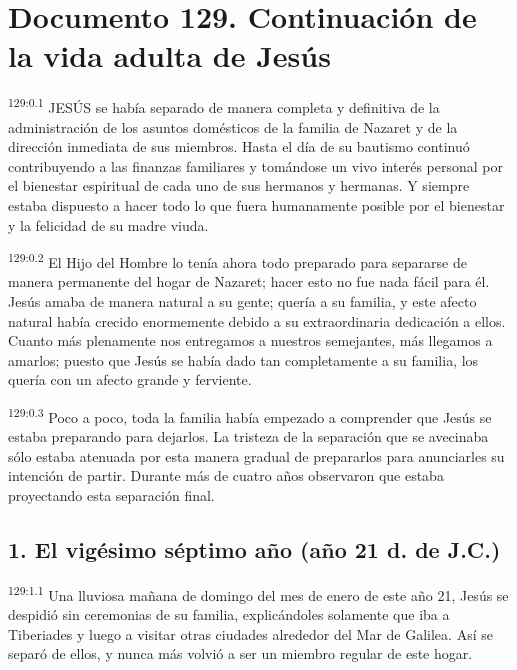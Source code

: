 \chapter{Documento 129. Continuación de la vida adulta de Jesús}
\par 
\textsuperscript{129:0.1} JESÚS se había separado de manera completa y definitiva de la administración de los asuntos domésticos de la familia de Nazaret y de la dirección inmediata de sus miembros. Hasta el día de su bautismo continuó contribuyendo a las finanzas familiares y tomándose un vivo interés personal por el bienestar espiritual de cada uno de sus hermanos y hermanas. Y siempre estaba dispuesto a hacer todo lo que fuera humanamente posible por el bienestar y la felicidad de su madre viuda.

\par 
\textsuperscript{129:0.2} El Hijo del Hombre lo tenía ahora todo preparado para separarse de manera permanente del hogar de Nazaret; hacer esto no fue nada fácil para él. Jesús amaba de manera natural a su gente; quería a su familia, y este afecto natural había crecido enormemente debido a su extraordinaria dedicación a ellos. Cuanto más plenamente nos entregamos a nuestros semejantes, más llegamos a amarlos; puesto que Jesús se había dado tan completamente a su familia, los quería con un afecto grande y ferviente.

\par 
\textsuperscript{129:0.3} Poco a poco, toda la familia había empezado a comprender que Jesús se estaba preparando para dejarlos. La tristeza de la separación que se avecinaba sólo estaba atenuada por esta manera gradual de prepararlos para anunciarles su intención de partir. Durante más de cuatro años observaron que estaba proyectando esta separación final.

\section*{1. El vigésimo séptimo año (año 21 d. de J.C.)}
\par 
\textsuperscript{129:1.1} Una lluviosa mañana de domingo del mes de enero de este año
21, Jesús se despidió sin ceremonias de su familia, explicándoles solamente que iba a Tiberiades y luego a visitar otras ciudades alrededor del Mar de Galilea. Así se separó de ellos, y nunca más volvió a ser un miembro regular de este hogar.


